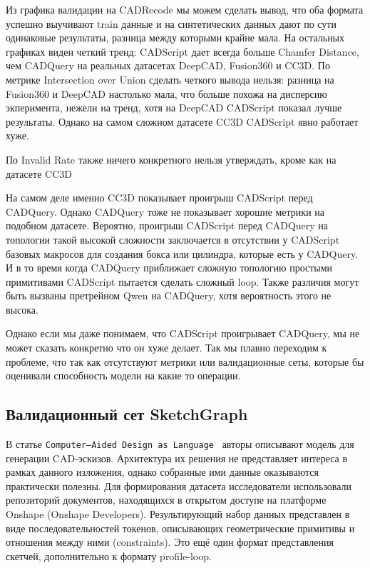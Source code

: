 Из графика валидации на CADRecode мы можем сделать вывод, что оба формата успешно выучивают train данные и на синтетических данных дают по сути одинаковые результаты, разница между которыми крайне мала.
На остальных графиках виден четкий тренд: CADScript дает всегда больше Chamfer Distance, чем CADQuery на реальных датасетах DeepCAD, Fusion360 и CC3D.
По метрике Intersection over Union сделать четкого вывода нельзя: разница на Fusion360 и DeepCAD настолько мала, что больше похожа на дисперсию экперимента, нежели на тренд, хотя на DeepCAD CADScript показал лучше результаты.
Однако на самом сложном датасете CC3D CADScript явно работает хуже.

По Invalid Rate также ничего конкретного нельзя утверждать, кроме как на датасете CC3D

На самом деле именно CC3D показывает проигрыш CADScript перед CADQuery. Однако CADQuery тоже не показывает хорошие метрики на подобном датасете.
Вероятно, проигрыш CADScript перед CADQuery на топологии такой высокой сложности заключается в отсутствии у CADScript базовых макросов для создания бокса или цилиндра, которые есть у CADQuery.
И в то время когда CADQuery приближает сложную топологию простыми примитивами CADScript пытается сделать сложный loop. Также различия могут быть вызваны претрейном Qwen на CADQuery, хотя вероятность этого не высока.

Однако если мы даже понимаем, что CADSсript проигрывает CADQuery, мы не может сказать конкретно что он хуже делает.
Так мы плавно переходим к проблеме, что так как отсутствуют метрики или валидационные сеты, которые бы оценивали способность модели на какие то операции.

\subsection{Валидационный сет SketchGraph}

В статье \texttt{Computer--Aided Design as Language}~\cite{ganin21_cadlanguage} авторы описывают модель для генерации CAD-эскизов. Архитектура их решения не представляет интереса в рамках данного изложения, однако собранные ими данные оказываются практически полезны.
Для формирования датасета исследователи использовали репозиторий документов, находящихся в открытом доступе на платформе Onshape (Onshape Developers). Результирующий набор данных представлен в виде последовательностей токенов, описывающих геометрические примитивы и отношения между ними (constraints). Это ещё один формат представления скетчей, дополнительно к формату profile-loop.

